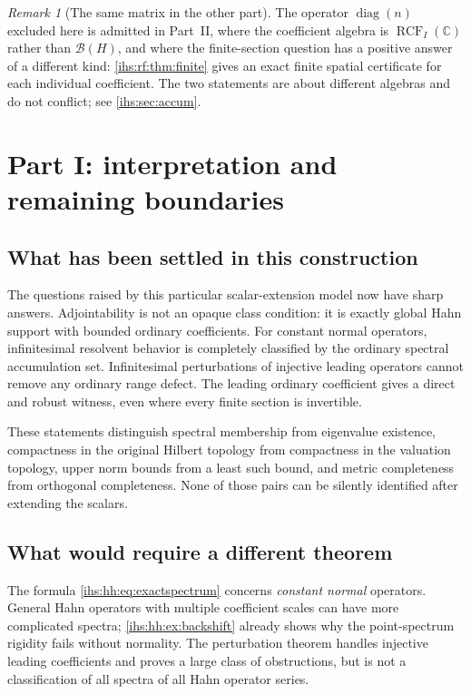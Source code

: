\documentclass[11pt,a4paper]{article}
\numberwithin{equation}{section}
\theoremstyle{definition}
\theoremstyle{remark}
\newtheorem{remark}[remark]{Remark}
\newcommand{\C}{\mathbb C}
\newcommand{\B}{\mathcal B(H)}
\newcommand{\diag}{\operatorname{diag}}
\newcommand{\RCF}{\operatorname{RCF}}
\begin{document}
\begin{remark}[The same matrix in the other part]\label{ihs:hh:rem:othersection}
The operator $\diag(n)$ excluded here is admitted in Part~II,
where the coefficient algebra is $\RCF_I(\C)$ rather than $\B$, and where
the finite-section question has a positive answer of a different kind:
\cref{ihs:rf:thm:finite} gives an exact finite spatial certificate for each
individual coefficient. The two statements are about different algebras and
do not conflict; see \cref{ihs:sec:accum}.
\end{remark}

\section{Part I: interpretation and remaining boundaries}\label{ihs:hh:sec:boundaries}

\subsection{What has been settled in this construction}\label{ihs:hh:sec:settled}
The questions raised by this particular scalar-extension model now have
sharp answers. Adjointability is not an opaque class condition: it is
exactly global Hahn support with bounded ordinary coefficients. For constant
normal operators, infinitesimal resolvent behavior is completely classified
by the ordinary spectral accumulation set. Infinitesimal perturbations of
injective leading operators cannot remove any ordinary range defect. The
leading ordinary coefficient gives a direct and robust witness, even where
every finite section is invertible.

These statements distinguish spectral membership from eigenvalue existence,
compactness in the original Hilbert topology from compactness in the
valuation topology, upper norm bounds from a least such bound, and metric
completeness from orthogonal completeness. None of those pairs can be
silently identified after extending the scalars.

\subsection{What would require a different theorem}\label{ihs:hh:sec:different}
The formula \eqref{ihs:hh:eq:exactspectrum} concerns \emph{constant normal}
operators. General Hahn operators with multiple coefficient scales can have
more complicated spectra; \cref{ihs:hh:ex:backshift} already shows why the
point-spectrum rigidity fails without normality. The perturbation theorem
handles injective leading coefficients and proves a large class of
obstructions, but is not a classification of all spectra of all Hahn
operator series.
\end{document}
